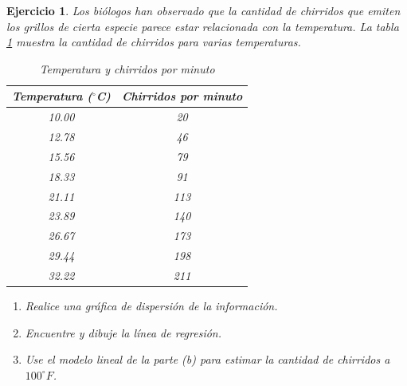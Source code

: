 \documentclass[12pt,tikz,border=5pt]{article}
\newtheorem{ejercicio}{Ejercicio}[section]
\begin{document}
\begin{ejercicio}
  Los biólogos han observado que la cantidad de chirridos que emiten los grillos de cierta especie parece estar relacionada con la temperatura. La tabla \ref{tabla:tempChiPerMin} muestra la cantidad de chirridos para varias temperaturas.
  
\begin{table}[!h]
    \centering
    \begin{tabular}{cc}
        \toprule
        \textbf{Temperatura ($^\circ$C)} & \textbf{Chirridos por minuto} \\
        \midrule
       10.00 & 20 \\
       12.78 & 46 \\
       15.56 & 79 \\
       18.33 & 91 \\
       21.11 & 113 \\
       23.89 & 140 \\
       26.67 & 173 \\
       29.44 & 198 \\
       32.22 & 211 \\
        \bottomrule
    \end{tabular}
    \caption{Temperatura y chirridos por minuto}
    \label{tabla:tempChiPerMin}
\end{table}

\begin{enumerate}[label=(\alph*)]
  \item Realice una gráfica de dispersión de la información.
  \item Encuentre y dibuje la línea de regresión.
  \item Use el modelo lineal de la parte (b) para estimar la cantidad de chirridos a $100 ^{\circ}F$.
\end{enumerate}
\end{ejercicio}
\end{document}
